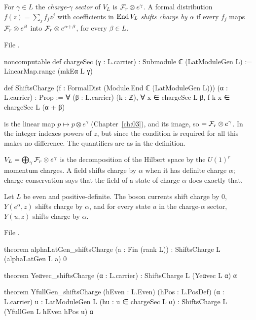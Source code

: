 \begin{definition}\label{l05:def:chargeSec}
For $\gamma\in L$ the \emph{charge-$\gamma$ sector} of $V_L$ is $\mathcal{F}_r\otimes e^\gamma$. A formal distribution
$f(z)=\sum_jf_jz^j$ with coefficients in $\operatorname{End} V_L$ \emph{shifts charge by $\alpha$} if every $f_j$ maps
$\mathcal{F}_r\otimes e^\beta$ into $\mathcal{F}_r\otimes e^{\alpha+\beta}$, for every $\beta\in L$.
\end{definition}

\noindent File .
\begin{leancode}
noncomputable def chargeSec (γ : L.carrier) : Submodule ℂ (LatModuleGen L) :=
  LinearMap.range (mkEα L γ)

def ShiftsCharge (f : FormalDist (Module.End ℂ (LatModuleGen L))) (α : L.carrier) : Prop :=
  ∀ (β : L.carrier) (k : ℤ), ∀ x ∈ chargeSec L β, f k x ∈ chargeSec L (α + β)
\end{leancode}

\begin{dictionary}
 is the linear map $p\mapsto p\otimes e^\gamma$ (Chapter~\ref{ch:03}), and  its
image, so  $=\mathcal{F}_r\otimes e^\gamma$. In  the integer  indexes powers of
$z$, but since the condition is required for all  this makes no difference. The quantifiers are as in the
definition.
\end{dictionary}

\begin{physics}
$V_L=\bigoplus_\gamma\mathcal{F}_r\otimes e^\gamma$ is the decomposition of the Hilbert space by the $U(1)^r$ momentum charges.
A field shifts charge by $\alpha$ when it has definite charge $\alpha$; charge conservation says that the field of a
state of charge $\alpha$ does exactly that.
\end{physics}

\begin{theorem}\label{l05:thm:shifts}
Let $L$ be even and positive-definite. The boson currents shift charge by $0$, $Y(e^\alpha,z)$ shifts charge by
$\alpha$, and for every state $u$ in the charge-$\alpha$ sector, $Y(u,z)$ shifts charge by $\alpha$.
\end{theorem}

\noindent File .
\begin{leancode}
theorem alphaLatGen_shiftsCharge (a : Fin (rank L)) :
    ShiftsCharge L (alphaLatGen L a) 0

theorem Yeαvec_shiftsCharge (α : L.carrier) :
    ShiftsCharge L (Yeαvec L α) α

theorem YfullGen_shiftsCharge (hEven : L.Even) (hPos : L.PosDef) (α : L.carrier)
    {u : LatModuleGen L} (hu : u ∈ chargeSec L α) :
    ShiftsCharge L (YfullGen L hEven hPos u) α
\end{leancode}

